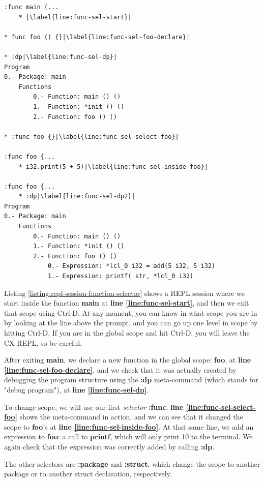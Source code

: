 \documentclass[11pt,fleqn,openany]{book} %
\begin{document}
\begin{lstlisting}[caption={REPL function selection meta-command},captionpos=b,label={listing:repl-session-function-selector}]
:func main {...
	* |\label{line:func-sel-start}|

* func foo () {}|\label{line:func-sel-foo-declare}|

* :dp|\label{line:func-sel-dp}|
Program
0.- Package: main
	Functions
		0.- Function: main () ()
		1.- Function: *init () ()
		2.- Function: foo () ()

* :func foo {}|\label{line:func-sel-select-foo}|

:func foo {...
	* i32.print(5 + 5)|\label{line:func-sel-inside-foo}|
    
:func foo {...
	* :dp|\label{line:func-sel-dp2}|
Program
0.- Package: main
	Functions
		0.- Function: main () ()
		1.- Function: *init () ()
		2.- Function: foo () ()
			0.- Expression: *lcl_0 i32 = add(5 i32, 5 i32)
			1.- Expression: printf( str, *lcl_0 i32)
\end{lstlisting}

Listing \ref{listing:repl-session-function-selector} shows a REPL session where we start inside the function \textbf{main} at \textbf{line \ref{line:func-sel-start}}, and then we exit that scope using Ctrl-D. At any moment, you can know in what scope you are in by looking at the line above the prompt, and you can go up one level in scope by hitting Ctrl-D. If you are in the global scope and hit Ctrl-D, you will leave the CX REPL, so be careful.

After exiting \textbf{main}, we declare a new function in the global scope: \textbf{foo}, at \textbf{line \ref{line:func-sel-foo-declare}}, and we check that it was actually created by debugging the program structure using the \textbf{:dp} meta-command (which stands for "debug program"), at \textbf{line \ref{line:func-sel-dp}}.

To change scope, we will use our first \emph{selector} \textbf{:func}. \textbf{line \ref{line:func-sel-select-foo}} shows the meta-command in action, and we can see that it changed the scope to \textbf{foo}'s at \textbf{line \ref{line:func-sel-inside-foo}}. At that same line, we add an expression to \textbf{foo}: a call to \textbf{printf}, which will only print 10 to the terminal. We again check that the expression was correctly added by calling \textbf{:dp}.

The other selectors are \textbf{:package} and \textbf{:struct}, which change the scope to another package or to another struct declaration, respectively.
\end{document}
